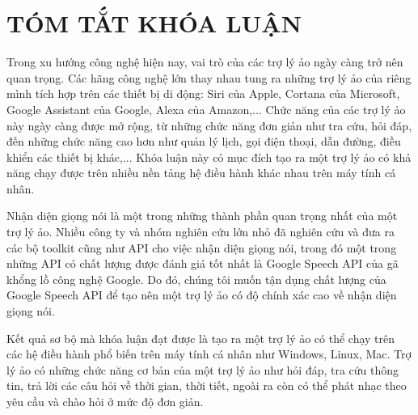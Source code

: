 \newpage
\chapter*{TÓM TẮT KHÓA LUẬN}

Trong xu hướng công nghệ hiện nay, vai trò của các trợ lý ảo ngày càng trở nên quan trọng. Các hãng công nghệ lớn thay nhau tung ra những trợ lý ảo của riêng mình tích hợp trên các thiết bị di động: Siri của Apple, Cortana của Microsoft, Google Assistant của Google, Alexa của Amazon,... Chức năng của các trợ lý ảo này ngày càng được mở rộng, từ những chức năng đơn giản như tra cứu, hỏi đáp, đến những chức năng cao hơn như quản lý lịch, gọi điện thoại, dẫn đường, điều khiển các thiết bị khác,... Khóa luận này có mục đích tạo ra một trợ lý ảo có khả năng chạy được trên nhiều nền tảng hệ điều hành khác nhau trên máy tính cá nhân. 

Nhận diện giọng nói là một trong những thành phần quan trọng nhất của một trợ lý ảo. Nhiều công ty và nhóm nghiên cứu lớn nhỏ đã nghiên cứu và đưa ra các bộ toolkit cũng như API cho việc nhận diện giọng nói, trong đó một trong những API có chất lượng được đánh giá tốt nhất là Google Speech API của gã khổng lồ công nghệ Google. Do đó, chúng tôi muốn tận dụng chất lượng của Google Speech API để tạo nên một trợ lý ảo có độ chính xác cao về nhận diện giọng nói. 

Kết quả sơ bộ mà khóa luận đạt được là tạo ra một trợ lý ảo có thể chạy trên các hệ điều hành phổ biến trên máy tính cá nhân như Windows, Linux, Mac. Trợ lý ảo có những chức năng cơ bản của một trợ lý ảo như hỏi đáp, tra cứu thông tin, trả lời các câu hỏi về thời gian, thời tiết, ngoài ra còn có thể phát nhạc theo yêu cầu và chào hỏi ở mức độ đơn giản. 

